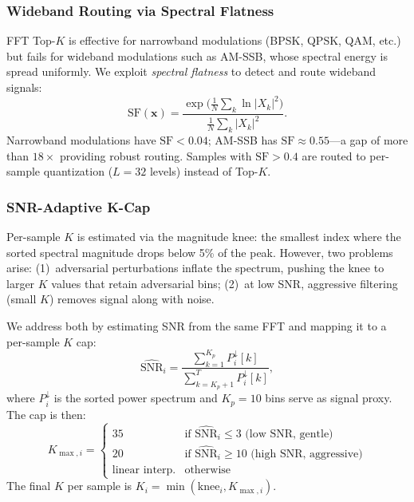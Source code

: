 \subsubsection{Wideband Routing via Spectral Flatness}

FFT Top-$K$ is effective for narrowband modulations (BPSK, QPSK, QAM, etc.)
but fails for wideband modulations such as AM-SSB, whose spectral energy is
spread uniformly.  We exploit \emph{spectral flatness} to detect and route
wideband signals:
\begin{equation}
  \text{SF}(\mathbf{x}) = \frac{\exp\!\bigl(\tfrac{1}{N}\sum_{k}\ln |X_k|^2\bigr)}
                               {\tfrac{1}{N}\sum_{k}|X_k|^2}.
  \label{eq:flatness}
\end{equation}
Narrowband modulations have $\text{SF} < 0.04$; AM-SSB has $\text{SF} \approx
0.55$---a gap of more than $18\times$ providing robust routing.  Samples with
$\text{SF} > 0.4$ are routed to per-sample quantization ($L = 32$ levels)
instead of Top-$K$.

\subsubsection{SNR-Adaptive K-Cap}

Per-sample $K$ is estimated via the magnitude knee: the smallest index where
the sorted spectral magnitude drops below 5\% of the peak.  However, two
problems arise: (1)~adversarial perturbations inflate the spectrum, pushing
the knee to larger $K$ values that retain adversarial bins; (2)~at low SNR,
aggressive filtering (small $K$) removes signal along with noise.

We address both by estimating SNR from the same FFT and mapping it to a
per-sample $K$ cap:
\begin{equation}
  \widehat{\text{SNR}}_i = \frac{\sum_{k=1}^{K_p} P_i^{\downarrow}[k]}
    {\sum_{k=K_p+1}^{T} P_i^{\downarrow}[k]},
  \label{eq:snr_est}
\end{equation}
where $P_i^{\downarrow}$ is the sorted power spectrum and $K_p = 10$ bins
serve as signal proxy.  The cap is then:
\begin{equation}
  K_{\max,i} = \begin{cases}
    35 & \text{if } \widehat{\text{SNR}}_i \leq 3 \text{ (low SNR, gentle)} \\
    20 & \text{if } \widehat{\text{SNR}}_i \geq 10 \text{ (high SNR, aggressive)} \\
    \text{linear interp.} & \text{otherwise}
  \end{cases}
  \label{eq:kmax}
\end{equation}
The final $K$ per sample is $K_i = \min(\text{knee}_i, K_{\max,i})$.

